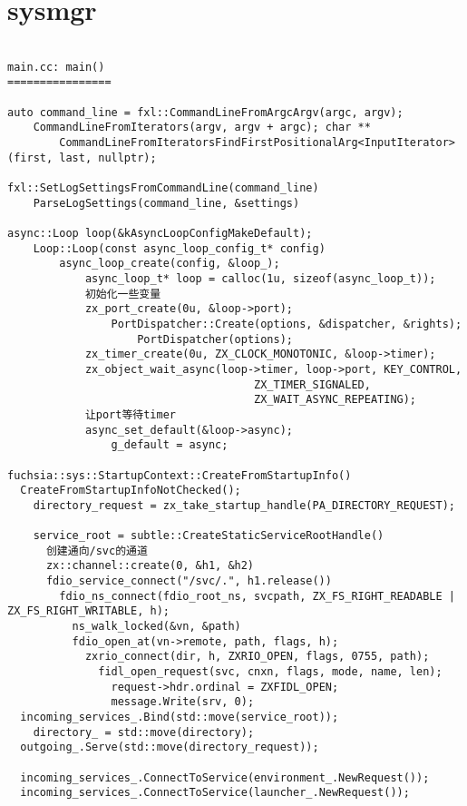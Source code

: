 \section{sysmgr}

\begin{verbatim}

main.cc: main()
================

auto command_line = fxl::CommandLineFromArgcArgv(argc, argv);
    CommandLineFromIterators(argv, argv + argc); char **
        CommandLineFromIteratorsFindFirstPositionalArg<InputIterator>(first, last, nullptr);

fxl::SetLogSettingsFromCommandLine(command_line)
    ParseLogSettings(command_line, &settings)

async::Loop loop(&kAsyncLoopConfigMakeDefault);
    Loop::Loop(const async_loop_config_t* config)
        async_loop_create(config, &loop_);
            async_loop_t* loop = calloc(1u, sizeof(async_loop_t));
            初始化一些变量
            zx_port_create(0u, &loop->port);
                PortDispatcher::Create(options, &dispatcher, &rights);
                    PortDispatcher(options);
            zx_timer_create(0u, ZX_CLOCK_MONOTONIC, &loop->timer);     
            zx_object_wait_async(loop->timer, loop->port, KEY_CONTROL,
                                      ZX_TIMER_SIGNALED,
                                      ZX_WAIT_ASYNC_REPEATING);
            让port等待timer
            async_set_default(&loop->async);
                g_default = async;

fuchsia::sys::StartupContext::CreateFromStartupInfo()
  CreateFromStartupInfoNotChecked();
    directory_request = zx_take_startup_handle(PA_DIRECTORY_REQUEST);

    service_root = subtle::CreateStaticServiceRootHandle()
      创建通向/svc的通道
      zx::channel::create(0, &h1, &h2)
      fdio_service_connect("/svc/.", h1.release())
        fdio_ns_connect(fdio_root_ns, svcpath, ZX_FS_RIGHT_READABLE | ZX_FS_RIGHT_WRITABLE, h);
          ns_walk_locked(&vn, &path)
          fdio_open_at(vn->remote, path, flags, h);
            zxrio_connect(dir, h, ZXRIO_OPEN, flags, 0755, path);
              fidl_open_request(svc, cnxn, flags, mode, name, len);
                request->hdr.ordinal = ZXFIDL_OPEN;
                message.Write(srv, 0);
  incoming_services_.Bind(std::move(service_root));
    directory_ = std::move(directory);
  outgoing_.Serve(std::move(directory_request));

  incoming_services_.ConnectToService(environment_.NewRequest());
  incoming_services_.ConnectToService(launcher_.NewRequest());


\end{verbatim}

